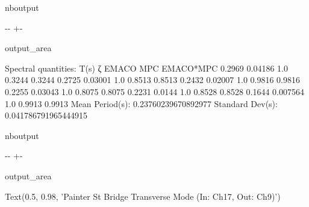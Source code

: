 \documentclass[letterpaper,10pt,english]{sphinxmanual}
\begin{document}
\begin{sphinxuseclass}{nboutput}
{

\kern-\sphinxverbatimsmallskipamount\kern-\baselineskip
\kern+\FrameHeightAdjust\kern-\fboxrule
\vspace{\nbsphinxcodecellspacing}

\begin{sphinxuseclass}{output_area}
\begin{sphinxuseclass}{}


\begin{sphinxVerbatim}[commandchars=\\\{\}]
Spectral quantities:
       T(s)        ζ        EMACO        MPC     EMACO*MPC
      0.2969     0.04186    1.0        0.3244     0.3244
      0.2725     0.03001    1.0        0.8513     0.8513
      0.2432     0.02007    1.0        0.9816     0.9816
      0.2255     0.03043    1.0        0.8075     0.8075
      0.2231     0.0144     1.0        0.8528     0.8528
      0.1644     0.007564   1.0        0.9913     0.9913
Mean Period(s): 0.23760239670892977
Standard Dev(s): 0.041786791965444915
\end{sphinxVerbatim}



\end{sphinxuseclass}
\end{sphinxuseclass}
}

\end{sphinxuseclass}
\begin{sphinxuseclass}{nboutput}
{

\kern-\sphinxverbatimsmallskipamount\kern-\baselineskip
\kern+\FrameHeightAdjust\kern-\fboxrule
\vspace{\nbsphinxcodecellspacing}

\begin{sphinxuseclass}{output_area}
\begin{sphinxuseclass}{}


\begin{sphinxVerbatim}[commandchars=\\\{\}]
\llap{\color{nbsphinxout}[5]:\,\hspace{\fboxrule}\hspace{\fboxsep}}Text(0.5, 0.98, 'Painter St Bridge Transverse Mode (In: Ch17, Out: Ch9)')
\end{sphinxVerbatim}



\end{sphinxuseclass}
\end{sphinxuseclass}
}

\end{sphinxuseclass}
\end{document}
